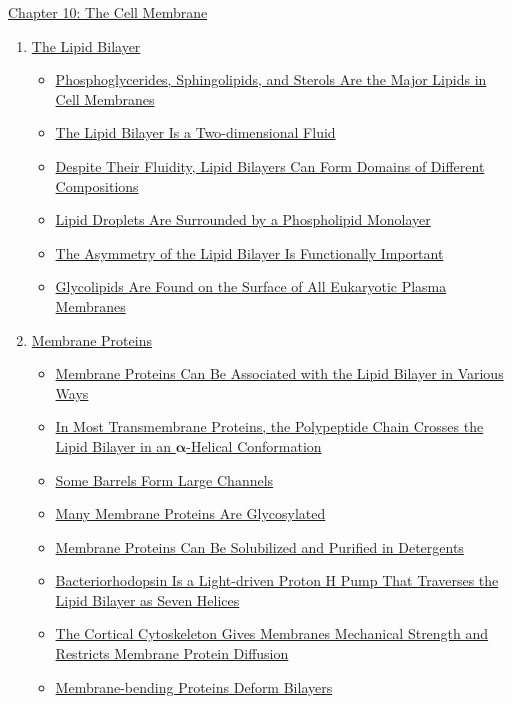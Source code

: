 \documentclass[12pt,letterpaper]{article}
\newcommand{\thetitle}{\hypertarget{home}{Cellular Biology}}
\begin{document}
\clearpage
\renewcommand{\thetitle}{\hypertarget{10}{The Genetic Code of Genes
and Genomes}}
\hypertarget{10}{} 


\begin{chapbox}{\hyperlink{home}{Chapter 10: The Cell Membrane}}
    \begin{enumerate}
        \item \hyperlink{10.1a}{The Lipid Bilayer}
        \begin{itemize}
            \item \hyperlink{10.1}{ Phosphoglycerides, Sphingolipids, and Sterols Are the Major Lipids in Cell Membranes}
            \item \hyperlink{10.2}{ The Lipid Bilayer Is a Two-dimensional Fluid}
            \item \hyperlink{10.3}{ Despite Their Fluidity, Lipid Bilayers Can Form Domains of Different Compositions}
            \item \hyperlink{10.4}{ Lipid Droplets Are Surrounded by a Phospholipid Monolayer}
            \item \hyperlink{10.5}{ The Asymmetry of the Lipid Bilayer Is Functionally Important}
            \item \hyperlink{10.6}{ Glycolipids Are Found on the Surface of All Eukaryotic Plasma Membranes}
        \end{itemize}
        \item \hyperlink{10.2a}{Membrane Proteins}
        \begin{itemize}
            \item \hyperlink{10.7}{ Membrane Proteins Can Be Associated with the Lipid Bilayer in Various Ways}
            \item \hyperlink{10.8}{ In Most Transmembrane Proteins, the Polypeptide Chain Crosses the Lipid Bilayer in an \(\bm{\alpha}\)-Helical Conformation}
            \item \hyperlink{10.9}{ Some \bfg{\beta} Barrels Form Large Channels}
            \item \hyperlink{10.10}{ Many Membrane Proteins Are Glycosylated}
            \item \hyperlink{10.11}{ Membrane Proteins Can Be Solubilized and Purified in Detergents}
            \item \hyperlink{10.12}{ Bacteriorhodopsin Is a Light-driven Proton H\bfg{^+} Pump That Traverses the Lipid Bilayer as Seven \bfg{\alpha} Helices}
            \item \hyperlink{10.1}{ The Cortical Cytoskeleton Gives Membranes Mechanical Strength and Restricts Membrane Protein Diffusion}
            \item \hyperlink{10.1}{ Membrane-bending Proteins Deform Bilayers}
        \end{itemize}
    \end{enumerate}
\end{chapbox}
\end{document}
